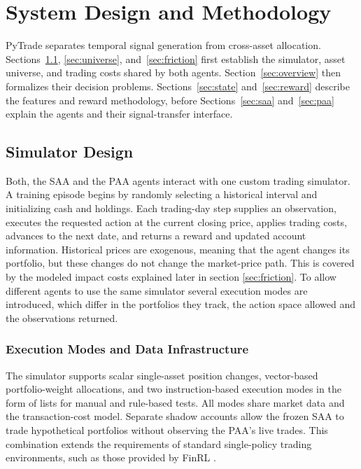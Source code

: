 \section{System Design and Methodology}
\label{sec:system-design}

PyTrade separates temporal signal generation from cross-asset allocation. Sections~\ref{sec:simulator}, \ref{sec:universe}, and~\ref{sec:friction} first establish the simulator, asset universe, and trading costs shared by both agents. Section~\ref{sec:overview} then formalizes their decision problems. Sections~\ref{sec:state} and~\ref{sec:reward} describe the features and reward methodology, before Sections~\ref{sec:saa} and~\ref{sec:paa} explain the agents and their signal-transfer interface.

\subsection{Simulator Design}
\label{sec:simulator}

Both, the SAA and the PAA agents interact with one custom trading simulator. A training episode begins by randomly selecting a historical interval and initializing cash and holdings. Each trading-day step supplies an observation, executes the requested action at the current closing price, applies trading costs, advances to the next date, and returns a reward and updated account information. Historical prices are exogenous, meaning that the agent changes its portfolio, but these changes do not change the market-price path. This is covered by the modeled impact costs explained later in section \ref{sec:friction}. To allow different agents to use the same simulator several execution modes are introduced, which differ in the portfolios they track, the action space allowed and the observations returned.

\subsubsection{Execution Modes and Data Infrastructure}

The simulator supports scalar single-asset position changes, vector-based portfolio-weight allocations, and two instruction-based execution modes in the form of lists for manual and rule-based tests. All modes share market data and the transaction-cost model. Separate shadow accounts allow the frozen SAA to trade hypothetical portfolios without observing the PAA's live trades. This combination extends the requirements of standard single-policy trading environments, such as those provided by FinRL \cite{liu2022finrldeepreinforcementlearning}.

